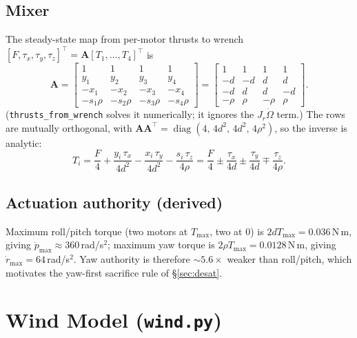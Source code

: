 \documentclass[11pt,a4paper]{article}
\newcommand{\vc}[1]{\bm{#1}}
\newcommand{\code}[1]{\texttt{\small #1}}
\DeclareMathOperator{\diag}{diag}
\begin{document}
\subsection{Mixer}
The steady-state map from per-motor thrusts to wrench $[F,\tau_x,\tau_y,\tau_z]^\top=\vc A[T_1,\dots,T_4]^\top$ is
\begin{equation}
\vc A=\begin{bmatrix}
1&1&1&1\\
y_1&y_2&y_3&y_4\\
-x_1&-x_2&-x_3&-x_4\\
-s_1\rho&-s_2\rho&-s_3\rho&-s_4\rho
\end{bmatrix}
=\begin{bmatrix}
1&1&1&1\\
-d&-d&d&d\\
-d&d&d&-d\\
-\rho&\rho&-\rho&\rho
\end{bmatrix}.
\end{equation}
(\code{thrusts\_from\_wrench} solves it numerically; it ignores the $J_r\dot\Omega$ term.) The rows are mutually orthogonal, with
$\vc A\vc A^\top=\diag(4,\,4d^2,\,4d^2,\,4\rho^2)$, so the inverse is analytic:
\begin{equation}
T_i=\frac F4+\frac{y_i\,\tau_x}{4d^2}-\frac{x_i\,\tau_y}{4d^2}-\frac{s_i\,\tau_z}{4\rho}
=\frac F4\pm\frac{\tau_x}{4d}\pm\frac{\tau_y}{4d}\mp\frac{\tau_z}{4\rho}.
\label{eq:mixinv}
\end{equation}

\subsection{Actuation authority (derived)}
Maximum roll/pitch torque (two motors at $T_{\max}$, two at 0) is $2dT_{\max}=0.036$\,N\,m, giving $\dot p_{\max}\approx360$\,rad/s$^2$;
maximum yaw torque is $2\rho T_{\max}=0.0128$\,N\,m, giving $\dot r_{\max}=64$\,rad/s$^2$. Yaw authority is therefore ${\sim}5.6\times$ weaker than roll/pitch,
which motivates the yaw-first sacrifice rule of \S\ref{sec:desat}.

\section{Wind Model (\code{wind.py})}
\end{document}
